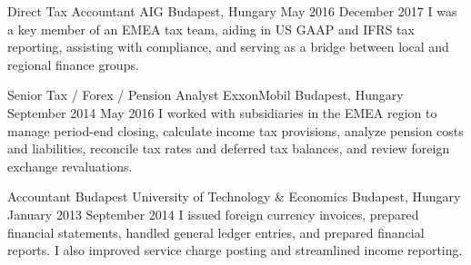 \begin{cventries}

  \cventry
    {Direct Tax Accountant} %
    {AIG} %
    {Budapest, Hungary} %
    {May 2016 \textendash December 2017} %
    {} %
    {I was a key member of an EMEA tax team, aiding in US GAAP and IFRS tax reporting, assisting with compliance, and serving as a bridge between local and regional finance groups.} %


  \cventry
    {Senior Tax / Forex / Pension Analyst} %
    {ExxonMobil} %
    {Budapest, Hungary} %
    {September 2014 \textendash May 2016} %
    {} %
    {I worked with subsidiaries in the EMEA region to manage period-end closing, calculate income tax provisions, analyze pension costs and liabilities, reconcile tax rates and deferred tax balances, and review foreign exchange revaluations.} %


  \cventry
    {Accountant} %
    {Budapest University of Technology \& Economics} %
    {Budapest, Hungary} %
    {January 2013 \textendash September 2014} %
    {} %
    {I issued foreign currency invoices, prepared financial statements, handled general ledger entries, and prepared financial reports. I also improved service charge posting and streamlined income reporting.} %


\end{cventries}
